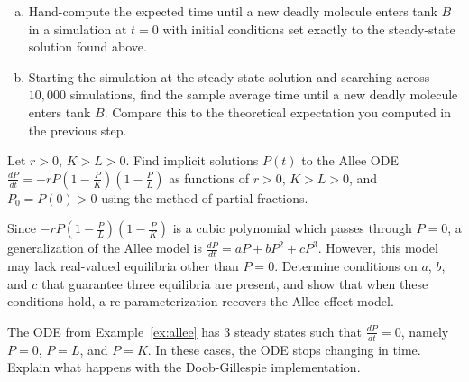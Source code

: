 \begin{exercises}
\begin{enumerate}[(a)]
\item Hand-compute the expected time until a new deadly molecule enters tank $B$ in a simulation at $t=0$ with initial conditions set exactly to the steady-state solution found above.

\item Starting the simulation at the steady state solution and searching across $10,000$ simulations, find the sample average time until a new deadly molecule enters tank $B$. Compare this to the theoretical expectation you computed in the previous step.

\end{enumerate}


\item \label{ex:hw_allee_pf}
Let $r > 0$, $K > L > 0$. Find implicit solutions $P(t)$ to the Allee ODE $\frac{dP}{dt} = -rP(1-\frac{P}{K})(1-\frac{P}{L})$ as functions of $r > 0$, $K > L > 0$, and $P_0 = P(0) > 0$ using the method of partial fractions.

\item \label{ex:hw_allee_cubic}
Since $-rP(1-\frac{P}{L})(1-\frac{P}{K})$ is a cubic polynomial which passes through $P=0$, a generalization of the Allee model is $\frac{dP}{dt} = aP + bP^2 + cP^3$. However, this model may lack real-valued equilibria other than $P = 0$. Determine conditions on $a$, $b$, and $c$ that guarantee three equilibria are present, and show that when these conditions hold, a re-parameterization recovers the Allee effect model.

\item \label{ex:hw_allee_steady_states}
The ODE from Example~\ref{ex:allee} has $3$ steady states such that $\frac{dP}{dt} = 0$, namely $P = 0$, $P = L$, and $P = K$. In these cases, the ODE stops changing in time. Explain what happens with the Doob-Gillespie implementation.


\end{exercises}
